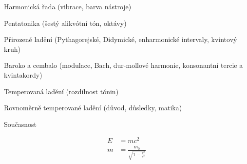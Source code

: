 \documentclass[12pt]{article}
\begin{document}
Harmonická řada (vibrace, barva nástroje)

Pentatonika (šestý alikvótní tón, oktávy)

Přirozené ladění (Pythagorejské, Didymické, enharmonické intervaly, kvintový kruh)

Baroko a cembalo (modulace, Bach, dur-mollové harmonie, konsonantní tercie a kvintakordy)

Temperovaná ladění (rozdílnost tónin)

Rovnoměrně temperované ladění (důvod, důsledky, matika)

Současnost

\begin{align}
E &= mc^2                              \\
m &= \frac{m_0}{\sqrt{1-\frac{v^2}{c^2}}}
\end{align}

{}

\end{document}
